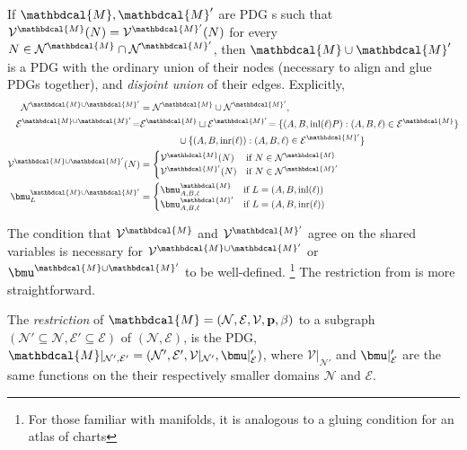 \documentclass{article}
\theoremstyle{plain}
\theoremstyle{definition}
\theoremstyle{remark}
\newcommand\mat[1]{\mathbf{#1}}
\newcommand{\notation}[2][]{#1}
\renewcommand{\notation}[2][]{{\color{notationcolor} #2}}
\newcommand{\vfullfootnote}[1]{}
\renewcommand{\vfullfootnote}[1]{\footnote{#1}}
\newcommand{\V}{\mathcal V}
\newcommand{\N}{\mathcal N}
\newcommand{\Ed}{\mathcal E}
\newcommand{\pdgvars}[1][]{(\N#1, \Ed#1, \V#1, \mat p#1, \beta#1)}
\newcommand{\dg}[1]{\mathbdcal{#1}}
\numberwithin{equation}{section}
\begin{document}
\begin{vfull}
\begin{defn}[union] \label{def:model-union}
	If $\dg M, \dg M'$ are PDG s such that $\V^\dg M(N) = \V^{\dg M'}(N)$ for every $N \in  \N^{\dg M} \cap \N^{\dg M'}$, then $\dg M \cup \dg M'$ is a PDG with the ordinary union of their nodes (necessary to align and glue PDGs together), and \emph{disjoint union} of their edges. \notation{Explicitly,
	\begin{align*}
		\N^{\dg M \cup \dg M'} &= \N^\dg M \cup \N^{\dg M'},  \\
		\Ed^{\dg M \cup \dg M'} \!=& \Ed^\dg M \sqcup \Ed^{\dg M'}\!
			=  \{ (A, B, \text{inl}(\ell)P) : (A,B,\ell)\in \Ed^\dg M \}  \\
				&\qquad\qquad \cup \{ (A, B, \text{inr}(\ell)) : (A,B,\ell)\in \Ed^{\dg M'} \} \\ 
		\V^{\dg M \cup \dg M'} (N) &= \begin{cases}
				\V^{\dg M}(N) & \text{if }N \in \N^\dg M \\
				\V^{\dg M'}(N) &\text{if }N \in \N^{\dg M'} 
			\end{cases}\\
		\bmu^{\dg M \cup \dg M'}_L &= \begin{cases}
			\bmu^{\dg M}_{A, B, \ell} &\text{if } L = (A, B, \text{inl} (\ell)) \\
			\bmu^{\dg M'}_{A, B, \ell} &\text{if } L = (A, B, \text{inr} (\ell)) 
		\end{cases}
	\end{align*}}
\end{defn}
The condition that $\V^\dg M$ and $\V^{\dg M'}$ agree on the shared variables is necessary for $\V^{\dg M\cup \dg M'}$ or $\bmu^{\dg M \cup \dg M'}$ to be well-defined.%
	\vfullfootnote{For those familiar with manifolds, it is analogous to a gluing condition for an atlas of charts}
The restriction from  is more straightforward.%

\begin{defn}[restriction]\label{def:restriction}
	The \emph{restriction} of $\dg M = \pdgvars[]$ to a subgraph $(\N' \subseteq \N, \Ed' \subseteq \Ed)$ of $(\N, \Ed)$, is the PDG, $\dg M|_{\N', \Ed'} = (\N', \Ed', \V |_{\N'}, \bmu|_\Ed')$, where 
	$\V|_{\N'}$ and $\bmu|_\Ed'$ are the same functions on the their respectively smaller domains $\N$ and $\Ed$. 
\end{defn}




\end{vfull}
\end{document}
